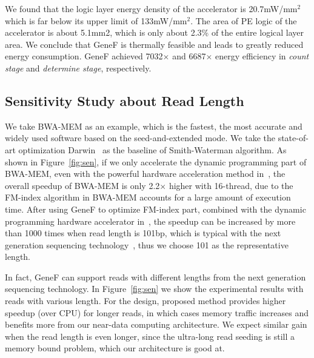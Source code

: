 \documentclass[9pt,conference]{IEEEtran}
\begin{document}
We found that the logic layer energy density of the accelerator is 20.7mW/mm$^{2}$ which is far below its upper limit of 133mW/mm$^{2}$. The area of PE logic of the accelerator is about 5.1mm2, which is only about 2.3\% of the entire logical layer area. We conclude that GeneF is thermally feasible and leads to greatly reduced energy consumption. GeneF achieved 7032$\times$ and 6687$\times$ energy efficiency in \textit{count stage} and \textit{determine stage}, respectively.

\subsection{Sensitivity Study about Read Length}

We take BWA-MEM as an example, which is the fastest, the most accurate and widely used software based on the seed-and-extended mode. We take the state-of-art optimization Darwin~\cite{turakhia2018darwin} as the baseline of Smith-Waterman algorithm. As shown in Figure~\ref{fig:sen}, if we only accelerate the dynamic programming part of BWA-MEM, even with the powerful hardware acceleration method in~\cite{turakhia2018darwin}, the overall speedup of BWA-MEM is only 2.2$\times$ higher with 16-thread, due to the FM-index algorithm in BWA-MEM accounts for a large amount of execution time. After using GeneF to optimize FM-index part, combined with the dynamic programming hardware accelerator in~\cite{turakhia2018darwin}, the speedup can be increased by more than 1000 times when read length is 101bp, which is typical with the next generation sequencing technology~\cite{depristo2011framework, fujiki2018genax}, thus we choose 101 as the representative length. 

In fact, GeneF can support reads with different lengths from the next generation sequencing technology. In Figure~\ref{fig:sen} we show the experimental results with reads with various length. For the design, proposed method provides higher speedup (over CPU) for longer reads, in which cases memory traffic increases and benefits more from our near-data computing architecture. We expect similar gain when the read length is even longer, since the ultra-long read seeding is still a memory bound problem, which our architecture is good at.
\end{document}
